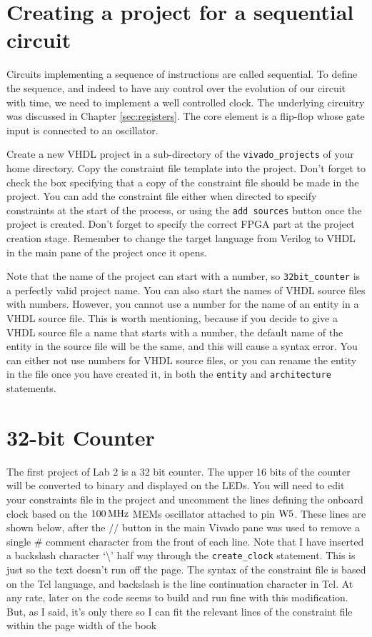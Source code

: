 \documentclass[../physical_computing.tex]{subfiles}
\begin{document}
\section{Creating a project for a sequential circuit}
\label{sec:sequential}

Circuits implementing a sequence of instructions are called sequential. To define the sequence, and indeed to have any control over the evolution of our circuit with time, we need to implement a well controlled clock. The underlying circuitry was discussed in Chapter \ref{sec:registers}. The core element is a flip-flop whose gate input is connected to an oscillator.

Create a new VHDL project in a sub-directory of the \texttt{vivado\_projects} of your home directory. Copy the constraint file template into the project. Don't forget to check the box specifying that a copy of the constraint file should be made in the project. You can add the constraint file either when directed to specify constraints at the start of the process, or using the \texttt{add sources} button once the project is created. Don't forget to specify the correct FPGA part at the project creation stage. Remember to change the target language from Verilog to VHDL in the main pane of the project once it opens. 

Note that the name of the project can start with a number, so \texttt{32bit\_counter} is a perfectly valid project name. You can also start the names of VHDL source files with numbers. However, you cannot use a number for the name of an entity in a VHDL source file. This is worth mentioning, because if you decide to give a VHDL source file a name that starts with a number, the default name of the entity in the source file will be the same, and this will cause a syntax error. You can either not use numbers for VHDL source files, or you can rename the entity in the file once you have created it, in both the \texttt{entity} and \texttt{architecture} statements.

\section{32-bit Counter}
\label{sec:32bit}

The first project of Lab 2 is a 32 bit counter. The upper 16 bits of the counter will be converted to binary and displayed on the LEDs. You will need to edit your constraints file in the project and uncomment the lines defining the onboard clock based on the $\rm 100\,MHz$ MEMs oscillator attached to pin $\rm W5$. These lines are shown below, after the $//$ button in the main Vivado pane was used to remove a single \# comment character from the front of each line. Note that I have inserted a backslash character `\textbackslash' half way through the \texttt{create\_clock} statement. This is just so the text doesn't run off the page. The syntax of the constraint file is based on the Tcl language, and backslash is the line continuation character in Tcl. At any rate, later on the code seems to build and run fine with this modification. But, as I said, it's only there so I can fit the relevant lines of the constraint file within the page width of the book
\end{document}
